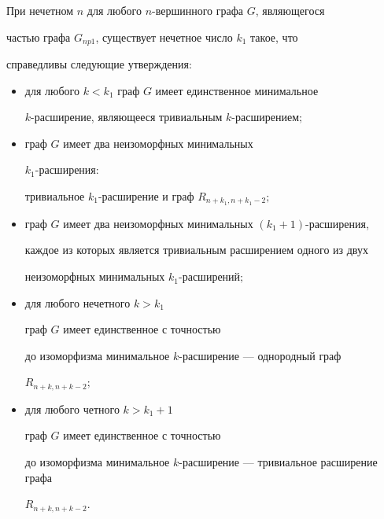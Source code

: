 \begin{lem}


При нечетном $n$ для любого $n$-вершинного графа $G$, являющегося


частью графа $G_{np1}$, существует нечетное число $k_1$ такое, что


справедливы следующие утверждения${:}$


\begin{itemize}


\item[а)] для любого $k < k_1$ граф $G$ имеет единственное минимальное


$k$-расширение, являющееся тривиальным $k$-расширением$;$


\item[б)] граф $G$ имеет два неизоморфных минимальных


$k_1$-расшире\-ния${:}$


тривиальное $k_1$-рас\-ши\-ре\-ние и граф $R_{n+k_1, n+k_1-2};$


\item[в)] граф $G$ имеет два неизоморфных минимальных $(k_1+1)$-расширения,


каждое из которых является тривиальным расширением одного из двух


неизоморфных минимальных $k_1$-расширений$;$


\item[г)] для любого нечетного $k > k_1$ 


граф $G$ имеет единственное с точностью


до изоморфизма минимальное $k$-расширение --- однородный граф


$R_{n+k,n+k-2};$


\item[д)] для любого четного $k > k_1+1$


граф $G$ имеет единственное с точностью


до изоморфизма минимальное $k$-расширение --- тривиальное расширение графа


$R_{n+k,n+k-2}$.


\end{itemize}


\end{lem}





